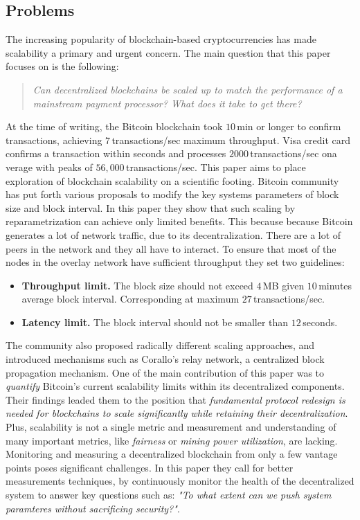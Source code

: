 \documentclass[USenglish]{uit-thesis}
\begin{document}
\subsection{Problems}
The increasing popularity of blockchain-based cryptocurrencies
has made scalability a primary and urgent concern. The main question
that this paper focuses on is the following:
\begin{quote}
\emph{Can decentralized blockchains be scaled up to match the performance
of a mainstream payment processor? What does it take
to get there?}
\end{quote}
At the time of writing, the Bitcoin blockchain took $10$\,min or longer
to confirm transactions, achieving $7$\,transactions/sec maximum
throughput. Visa credit card confirms a transaction within seconds
and processes $2000$\,transactions/sec ona verage with peaks
of $56,000$\,transactions/sec. This paper aims to place
exploration of blockchain scalability on a scientific footing.
Bitcoin community has put forth various proposals to modify
the key systems parameters of block size and block interval.
In this paper they show that such scaling by reparametrization
can achieve only limited benefits. This because because Bitcoin
generates a lot of network traffic, due to its
decentralization. There are a lot of peers in the network
and they all have to interact. To ensure that most
of the nodes in the overlay network have sufficient
throughput they set two guidelines:
\begin{itemize}[noitemsep]
	\item \textbf{Throughput limit.} The block size should not exceed $4$\,MB
	given $10$\,minutes average block interval. Corresponding at maximum
	$27$\,transactions/sec.
	\item \textbf{Latency limit.} The block interval should not be smaller
	than $12$\,seconds.
\end{itemize}
The community also proposed radically different scaling approaches,
and introduced mechanisms such as Corallo's relay network,
a centralized block propagation mechanism.
One of the main contribution of this paper was to \emph{quantify}
Bitcoin's current scalability limits within its decentralized components.
Their findings leaded them to the position that \emph{fundamental protocol
redesign is needed for blockchains to scale significantly while retaining their
decentralization}. Plus, scalability is not a single metric and
measurement and understanding of many important metrics,
like \emph{fairness} or \emph{mining power utilization}, are lacking.
Monitoring and measuring a decentralized blockchain from only
a few vantage points poses significant challenges. In this paper
they call for better measurements techniques, by continuously monitor
the health of the decentralized system to answer key questions such as:
\emph{"To what extent can we push system paramteres without sacrificing security?"}.
\end{document}
